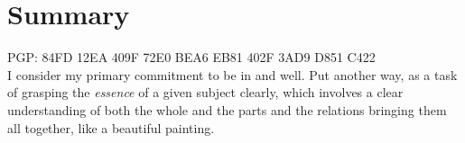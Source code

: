 \section{Summary}
\setlength{\parskip}{-0.3em plus 0em minus 0mm}
PGP: 84FD 12EA 409F 72E0 BEA6 EB81 402F 3AD9 D851 C422  \\


I consider my primary commitment to be in  and  well. 
Put another way, as a task of grasping the {\it essence} of a given subject clearly, which involves a clear understanding of both the whole and the parts and the relations bringing them all together, like a beautiful painting.
\\


